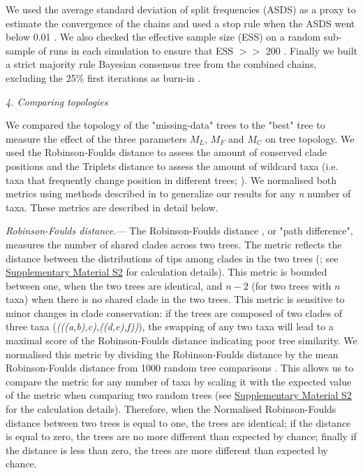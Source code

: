 \documentclass[12pt,letterpaper]{article}
\renewcommand{\subsection}[1]{%
\bigskip
\begin{center}
\begin{large}
\normalfont\itshape #1
\end{large}
\end{center}}
\renewcommand{\subsubsection}[1]{%
\vspace{2ex}
\noindent
\textit{#1.}---}
\begin{document}
We used the average standard deviation of split frequencies (ASDS) as a proxy to estimate the convergence of the chains and used a stop rule when the ASDS went below 0.01 \citep{Ronquist2012mrbayes}. We also checked the effective sample size (ESS) on a random sub-sample of runs in each simulation to ensure that ESS $>>$ 200 \citep{drummond2006ess}. Finally we built a strict majority rule Bayesian consensus tree from the combined chains, excluding the 25\% first iterations as burn-in \citep{Ronquist2012mrbayes}.

\subsection{4. Comparing topologies}
We compared the topology of the "missing-data" trees to the "best" tree to measure the effect of the three parameters $M_{L}$, $M_{F}$ and $M_{C}$ on tree topology. We used the Robinson-Foulds distance \citep{RF1981} to assess the amount of conserved clade positions and the Triplets distance \citep{dobson1975triplets} to assess the amount of wildcard taxa  (i.e. taxa that frequently change position in different trees; \citealt{kearneyfragmentary2002}). We normalised both metrics using methods described in \citet{Bogdanowicz2012} to generalize our results for any \textit{n} number of taxa. These metrics are described in detail below.

\subsubsection{Robinson-Foulds distance}
The Robinson-Foulds distance \citep{RF1981}, or "path difference", measures the number of shared clades across two trees. The metric reflects the distance between the distributions of tips among clades in the two trees (\citealt{RF1981}; see \hyperref[SupplementaryMaterial]{Supplementary Material S2} for calculation details). This metric is bounded between one, when the two trees are identical, and $n-2$ (for two trees with $n$ taxa) when there is no shared clade in the two trees. This metric is sensitive to minor changes in clade conservation: if the trees are composed of two clades of three taxa (\textit{(((a,b),c),((d,e),f))}), the swapping of any two taxa will lead to a maximal score of the Robinson-Foulds distance indicating poor tree similarity. We normalised this metric by dividing the Robinson-Foulds distance by the mean Robinson-Foulds distance from 1000 random tree comparisons \citep{Bogdanowicz2012}. This allows us to compare the metric for any number of taxa by scaling it with the expected value of the metric when comparing two random trees (see \hyperref[SupplementaryMaterial]{Supplementary Material S2} for the calculation details). Therefore, when the Normalised Robinson-Foulds distance between two trees is equal to one, the trees are identical; if the distance is equal to zero, the trees are no more different than expected by chance; finally if the distance is less than zero, the trees are more different than expected by chance.
\end{document}
